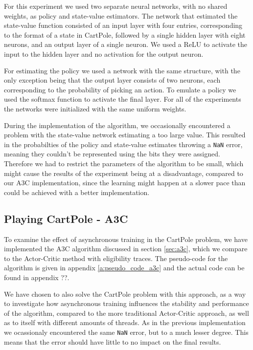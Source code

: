 \documentclass[11pt]{article}
\begin{document}
For this experiment we used two separate neural networks, with no
shared weights, as policy and state-value estimators.
The network that estimated the state-value function consisted of an
input layer with four entries, corresponding to the format of a state in CartPole,
followed by a single hidden layer with eight neurons, and an output layer of a single
neuron.
We used a ReLU to activate the input to the
hidden layer and no activation for the output neuron.

For estimating the policy we used a network with the same structure,
with the only exception being that the output layer consists of two
neurons, each corresponding to the probability of picking an action.
To emulate a policy we used the softmax function
to activate the final layer.
For all of the experiments the networks were initialized with the same uniform
weights.

During the implementation of the algorithm, we occasionally encountered a problem with the
state-value network estimating a too large value.
This resulted in the probabilties of the policy and state-value estimates throwing a \texttt{NaN} error,
meaning they couldn't be represented using the bits they were assigned.
Therefore we had to restrict the parameters of the algorithm to
be small, which might cause the results of the
experiment being at a disadvantage, compared to our A3C implementation, since the learning
might happen at a slower pace than could be achieved with a better implementation.

\subsection{Playing CartPole - A3C}

To examine the effect of asynchronous training in the CartPole problem,
we have implemented the A3C algorithm discussed in section \ref{sec:a3c},
which we compare to the Actor-Critic method with eligibility traces.
The pseudo-code for the algorithm is given in appendix \ref{a:pseudo_code_a3c}
and the actual code can be found in appendix ??.

We have chosen to also solve the CartPole problem with this approach, as a way to
investigate how asynchronous training influences the stability and performance of the algorithm,
compared to the more traditional Actor-Critic approach, as well as 
to itself with different amounts of threads.
As in the previous implementation we ocassionaly encountered the same \texttt{NaN} error,
but to a much lesser degree.
This means that the error should have little to no impact on
the final results.
\end{document}
